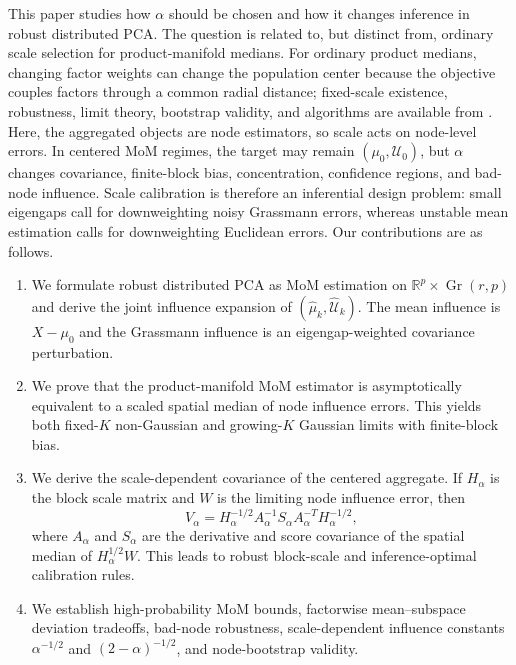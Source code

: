 \documentclass[11pt]{article}
\newcommand{\R}{\mathbb R}
\newcommand{\U}{\mathcal U}
\newcommand{\Gr}{\operatorname{Gr}}
\begin{document}
This paper studies how \(\alpha\) should be chosen and how it changes inference
in robust distributed PCA.  The question is related to, but distinct from,
ordinary scale selection for product-manifold medians.  For ordinary product
medians, changing factor weights can change the population center because the
objective couples factors through a common radial distance; fixed-scale
existence, robustness, limit theory, bootstrap validity, and algorithms are
available from \citet{park_2026_GeometricMediansProduct}.  Here, the aggregated
objects are node estimators, so scale acts on node-level errors.  In centered
MoM regimes, the target may remain \((\mu_0,\U_0)\), but \(\alpha\) changes
covariance, finite-block bias, concentration, confidence regions, and bad-node
influence.  Scale calibration is therefore an inferential design problem: small
eigengaps call for downweighting noisy Grassmann errors, whereas unstable mean
estimation calls for downweighting Euclidean errors. Our contributions are as follows.
\begin{enumerate}
\item We formulate robust distributed PCA as MoM estimation on
\(\R^p\times\Gr(r,p)\) and derive the joint influence expansion of
\((\widehat\mu_k,\widehat{\mathcal U}_k)\).  The mean influence is \(X-\mu_0\) and 
the Grassmann influence is an eigengap-weighted covariance perturbation.

\item We prove that the product-manifold MoM estimator
is asymptotically equivalent to a scaled spatial median of node influence
errors.  This yields both fixed-\(K\) non-Gaussian and growing-\(K\)
Gaussian limits with finite-block bias.

\item We derive the scale-dependent covariance of the centered aggregate.  If
\(H_\alpha\) is the block scale matrix and \(W\) is the limiting node influence
error, then
\begin{equation}\label{eq:intro-covariance}
    V_\alpha
    =
    H_\alpha^{-1/2}
    A_\alpha^{-1}
    S_\alpha
    A_\alpha^{-T}
    H_\alpha^{-1/2},
\end{equation}
where \(A_\alpha\) and \(S_\alpha\) are the derivative and score covariance of
the spatial median of \(H_\alpha^{1/2}W\).  This leads to robust block-scale and
inference-optimal calibration rules.

\item We establish high-probability MoM bounds, factorwise mean--subspace
deviation tradeoffs, bad-node robustness, scale-dependent influence constants
\(\alpha^{-1/2}\) and \((2-\alpha)^{-1/2}\), and node-bootstrap validity.
\end{enumerate}
\end{document}

